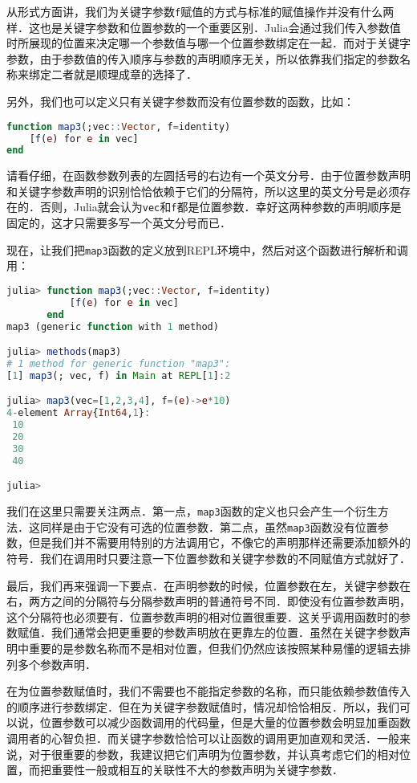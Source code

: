 从形式方面讲，我们为关键字参数\verb|f|赋值的方式与标准的赋值操作并没有什么两样．这也是关键字参数和位置参数的一个重要区别．Julia会通过我们传入参数值时所展现的位置来决定哪一个参数值与哪一个位置参数绑定在一起．而对于关键字参数，由于参数值的传入顺序与参数的声明顺序无关，所以依靠我们指定的参数名称来绑定二者就是顺理成章的选择了．

另外，我们也可以定义只有关键字参数而没有位置参数的函数，比如：

\begin{lstlisting}[language=julia]
function map3(;vec::Vector, f=identity)
    [f(e) for e in vec]
end
\end{lstlisting}

请看仔细，在函数参数列表的左圆括号的右边有一个英文分号．由于位置参数声明和关键字参数声明的识别恰恰依赖于它们的分隔符，所以这里的英文分号是必须存在的．否则，Julia就会认为\verb|vec|和\verb|f|都是位置参数．幸好这两种参数的声明顺序是固定的，这才只需要多写一个英文分号而已．

现在，让我们把\verb|map3|函数的定义放到REPL环境中，然后对这个函数进行解析和调用：

\begin{lstlisting}[language=julia]
julia> function map3(;vec::Vector, f=identity)
           [f(e) for e in vec]
       end
map3 (generic function with 1 method)

julia> methods(map3)
# 1 method for generic function "map3":
[1] map3(; vec, f) in Main at REPL[1]:2

julia> map3(vec=[1,2,3,4], f=(e)->e*10)
4-element Array{Int64,1}:
 10
 20
 30
 40

julia>
\end{lstlisting}

我们在这里只需要关注两点．第一点，\verb|map3|函数的定义也只会产生一个衍生方法．这同样是由于它没有可选的位置参数．第二点，虽然\verb|map3|函数没有位置参数，但是我们并不需要用特别的方法调用它，不像它的声明那样还需要添加额外的符号．我们在调用时只要注意一下位置参数和关键字参数的不同赋值方式就好了．

最后，我们再来强调一下要点．在声明参数的时候，位置参数在左，关键字参数在右，两方之间的分隔符与分隔参数声明的普通符号不同．即使没有位置参数声明，这个分隔符也必须要有．位置参数声明的相对位置很重要．这关乎调用函数时的参数赋值．我们通常会把更重要的参数声明放在更靠左的位置．虽然在关键字参数声明中重要的是参数名称而不是相对位置，但我们仍然应该按照某种易懂的逻辑去排列多个参数声明．

在为位置参数赋值时，我们不需要也不能指定参数的名称，而只能依赖参数值传入的顺序进行参数绑定．但在为关键字参数赋值时，情况却恰恰相反．所以，我们可以说，位置参数可以减少函数调用的代码量，但是大量的位置参数会明显加重函数调用者的心智负担．而关键字参数恰恰可以让函数的调用更加直观和灵活．一般来说，对于很重要的参数，我建议把它们声明为位置参数，并认真考虑它们的相对位置，而把重要性一般或相互的关联性不大的参数声明为关键字参数．

